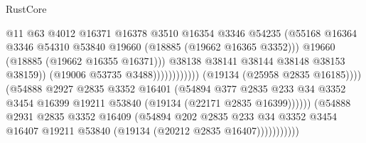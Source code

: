 \begin{lexlean}{RustCore}
\begin{coremodule}
                                                      @11
                                                      @63
                                                      @4012
                                                      @16371
                                                      @16378
                                                      @3510
                                                      @16354
                                                      @3346
                                                      @54235
                                                      (@55168
                                                        @16364
                                                        @3346
                                                        @54310
                                                        @53840
                                                        @19660
                                                        (@18885 (@19662 @16365 @3352)))
                                                      @19660
                                                      (@18885 (@19662 @16355 @16371)))
                                                    @38138
                                                    @38141
                                                    @38144
                                                    @38148
                                                    @38153
                                                    @38159))
                                                (@19006 @53735 @3488))))))))))))
                          (@19134 (@25958 @2835 @16185))))
                      (@54888
                        @2927
                        @2835
                        @3352
                        @16401
                        (@54894
                          @377
                          @2835
                          @233
                          @34
                          @3352
                          @3454
                          @16399
                          @19211
                          @53840
                          (@19134 (@22171 @2835 @16399))))))
                  (@54888
                    @2931
                    @2835
                    @3352
                    @16409
                    (@54894
                      @202
                      @2835
                      @233
                      @34
                      @3352
                      @3454
                      @16407
                      @19211
                      @53840
                      (@19134 (@20212 @2835 @16407)))))))))))

\end{coremodule}
\end{lexlean}
